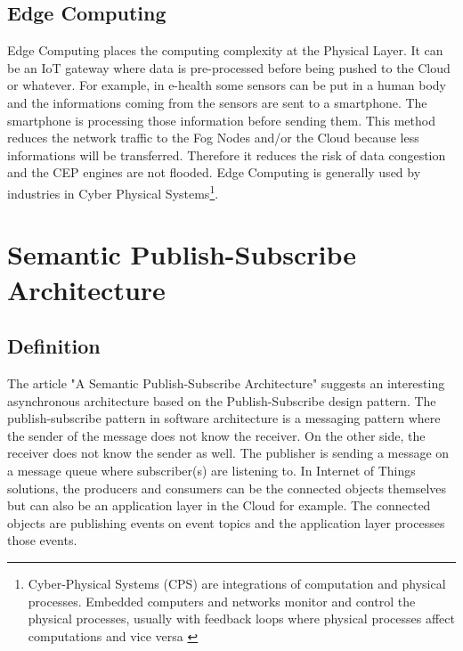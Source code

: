 \documentclass[11pt]{article}
\begin{document}

\subsection{Edge Computing}

Edge Computing places the computing complexity at the Physical Layer. It can be an IoT gateway where data is pre-processed before being pushed to the Cloud or whatever. For example, in e-health some sensors can be put in a human body and the informations coming from the sensors are sent to a smartphone. The smartphone is processing those information before sending them. This method reduces the network traffic to the Fog Nodes and/or the Cloud because less informations will be transferred. Therefore it reduces the risk of data congestion and the CEP engines are not flooded. Edge Computing is generally used by industries in Cyber Physical Systems\footnote{Cyber-Physical Systems (CPS) are integrations of computation and physical processes. Embedded computers and networks monitor and control the physical processes, usually with feedback loops where physical processes affect computations and vice versa \cite{5}}.


\section{Semantic Publish-Subscribe Architecture} \label{pub-sub}

\subsection{Definition}

The article "A Semantic Publish-Subscribe Architecture" \cite{A-Semantic-Publish-Subscribe-Architecture} suggests an interesting asynchronous architecture based on the Publish-Subscribe design pattern. The publish-subscribe pattern in software architecture is a messaging pattern where the sender of the message does not know the receiver. On the other side, the receiver does not know the sender as well. The publisher is sending a message on a message queue where subscriber(s) are listening to. In Internet of Things solutions, the producers and consumers can be the connected objects themselves but can also be an application layer in the Cloud for example. The connected objects are publishing events on event topics and the application layer processes those events.
\end{document}
